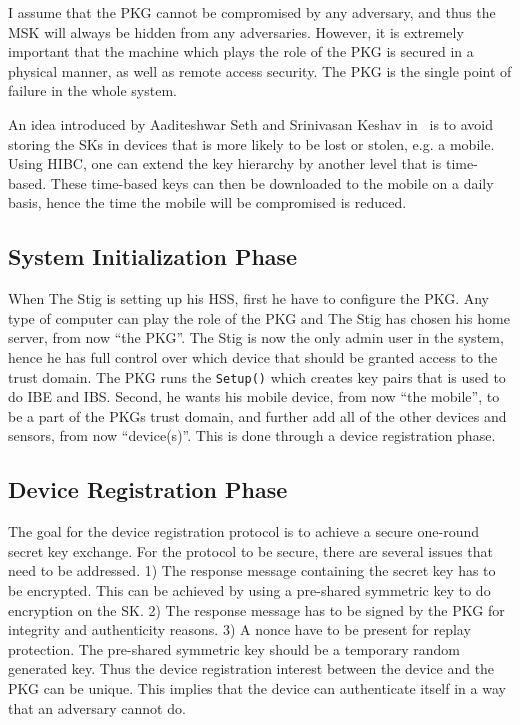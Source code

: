 I assume that the \gls{PKG} cannot be compromised by any adversary, and thus the \gls{MSK} will always be hidden from any adversaries. 
However, it is extremely important that the machine which plays the role of the \gls{PKG} is secured in a physical manner, as well as remote access security. 
The \gls{PKG} is the single point of failure in the whole system.

An idea introduced by Aaditeshwar Seth and Srinivasan Keshav in~\cite[Section 5.4]{Seth:2005:PSD:1897159.1897165} is to avoid storing the \gls{SK}s in devices that is more likely to be lost or stolen, e.g. a mobile.
Using \gls{HIBC}, one can extend the key hierarchy by another level that is time-based.
These time-based keys can then be downloaded to the mobile on a daily basis, hence the time the mobile will be compromised is reduced.

\subsection{System Initialization Phase}
When The Stig is setting up his \gls{HSS}, first he have to configure the \gls{PKG}. 
Any type of computer can play the role of the \gls{PKG} and The Stig has chosen his home server, from now ``the PKG''.
The Stig is now the only admin user in the system, hence he has full control over which device that should be granted access to the trust domain.
The \gls{PKG} runs the \texttt{Setup()} which creates key pairs that is used to do \gls{IBE} and \gls{IBS}.
Second, he wants his mobile device, from now ``the mobile'', to be a part of the \gls{PKG}s trust domain, and further add all of the other devices and sensors, from now ``device(s)''. 
This is done through a device registration phase.

\subsection{Device Registration Phase}\label{init}
The goal for the device registration protocol is to achieve a secure one-round secret key exchange.
For the protocol to be secure, there are several issues that need to be addressed. 
1) The response message containing the secret key has to be encrypted. 
This can be achieved by using a pre-shared symmetric key to do encryption on the \gls{SK}.
2) The response message has to be signed by the \gls{PKG} for integrity and authenticity reasons.
3) A nonce have to be present for replay protection.
The pre-shared symmetric key should be a temporary random generated key. 
Thus the device registration \gls{interest} between the device and the \gls{PKG} can be unique.
This implies that the device can authenticate itself in a way that an adversary cannot do.

